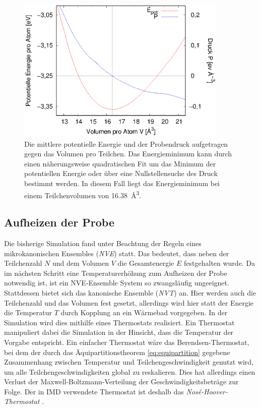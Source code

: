 		\begin{figure}[!ht]
			\centering
			\includegraphics[width=0.9\textwidth]{chapter/main/single/plt/equilibration/homdef.eps}
			\caption{Die mittlere potentielle Energie und der Probendruck aufgetragen gegen das
			Volumen pro Teilchen. Das Energieminimum kann durch einen näherungsweise quadratischen
			Fit um das Minimum der potentiellen Energie oder über eine Nullstellensuche des Druck
			bestimmt werden. In diesem Fall liegt das Energieminimum bei einem Teilchenvolumen von
			\SI{16.38}{\angstrom\cubed}.}
			\label{fig:homdef}
		\end{figure}

	\subsection{Aufheizen der Probe}
		Die bisherige Simulation fand unter Beachtung der Regeln eines mikrokanonischen Ensembles
		(\emph{NVE}) statt. Das bedeutet, dass neben der Teilchenzahl $N$ und dem Volumen $V$ die
		Gesamtenergie $E$ festgehalten wurde. Da im nächsten Schritt eine Temperaturerhöhung zum
		Aufheizen der Probe notwendig ist, ist ein NVE-Ensemble System so zwangsläufig ungeeignet.
		Stattdessen bietet sich das kanonische Ensemble (\emph{NVT}) an. Hier werden auch die
		Teilchenzahl und das Volumen fest gesetzt, allerdings wird hier statt der Energie die
		Temperatur $T$ durch Kopplung an ein Wärmebad vorgegeben. In der Simulation wird dies
		mithilfe eines Thermostats realisiert. Ein Thermostat manipuliert dabei die Simulation in
		der Hinsicht, dass die Temperatur der Vorgabe entspricht. Ein einfacher Thermostat wäre
		das Berendsen-Thermostat, bei dem der durch das Äquipartitionstheorem
		\eqref{eq:equipartition} gegebene Zusammenhang zwischen Temperatur und
		Teilchengeschwindigkeit genutzt wird, um alle Teilchengeschwindigkeiten global zu
		reskalieren. Dies hat allerdings einen Verlust der Maxwell-Boltzmann-Verteilung der
		Geschwindigkeitsbeträge zur Folge. Der in IMD verwendete Thermostat ist deshalb das
		\emph{Nosé-Hoover-Thermostat} \cite{rapp2014laserablation}.


